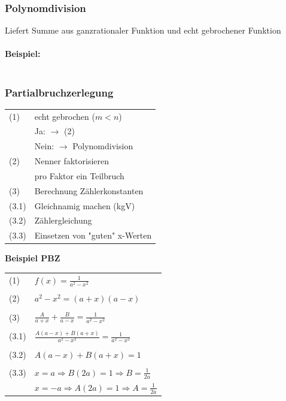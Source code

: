 		\subsubsection{Polynomdivision}
			Liefert Summe aus ganzrationaler Funktion und echt gebrochener Funktion\\
			\\
			\textbf{Beispiel:}\\
				\vspace{-5pt}  \\
			
		\subsubsection{Partialbruchzerlegung}
			\begin{tabular}{ll}
				(1) & echt gebrochen ($m < n$) \\
				    & Ja: $\rightarrow$ (2) \\
					& Nein: $\rightarrow$ Polynomdivision \\
				(2) & Nenner faktorisieren \\
				    & pro Faktor ein Teilbruch \\
				(3) & Berechnung Zählerkonstanten \\
				(3.1) & Gleichnamig machen (kgV) \\
				(3.2) & Zählergleichung \\
				(3.3) & Einsetzen von "guten"  x-Werten \\			
			\end{tabular}
			
			\textbf{Beispiel PBZ} \\
				\begin{tabular}{ll}
					(1) & $f(x) = \frac{1}{a^2 - x^2}$ \\
					\\
					(2) & $a^2 - x^2 = (a+x)(a-x)$ \\
					\\
					(3) & $\frac{A}{a+x} + \frac{B}{a-x} = \frac{1}{a^2 - x^2}$\\
					\\
					(3.1) & $\frac{A(a-x) + B(a+x)}{a^2 - x^2} = \frac{1}{a^2 - x^2}$ \\
					\\
					(3.2) &$ A(a-x) + B(a+x) = 1$ \\
					\\
					(3.3) & $x = a \Rightarrow B(2a) = 1 \Rightarrow B = \frac{1}{2a} $ \\			
					& $x = -a \Rightarrow A(2a) = 1 \Rightarrow A = \frac{1}{2a} $ \\
				\end{tabular}
		
